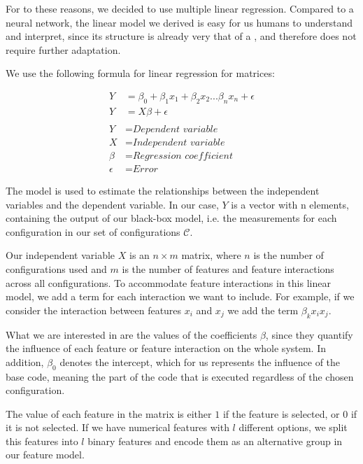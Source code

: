 For to these reasons, we decided to use multiple linear regression. Compared to a neural network, the linear model we 
derived is easy for us humans to understand and interpret, since its structure is already very that of a \perfInfluenceModel,
and therefore does not require further adaptation.

We use the following formula for linear regression for matrices\cite{Linear-Regression-Performance}:

\begin{align}\label{formula:linReg}
    Y &= \beta_0 + \beta_1 x_1 + \beta_2 x_2 ... \beta_n x_n + \epsilon   \\
    Y &= X \beta + \epsilon \nonumber\\ \nonumber \\ \nonumber
    Y &= \textit{Dependent variable}\\ \nonumber
    X &= \textit{Independent variable}\\ \nonumber
    \beta &= \textit{Regression coefficient}\\ \nonumber
    \epsilon &= \textit{Error} \nonumber
\end{align}

The model is used to estimate the relationships between the independent variables and the dependent variable.
In our case, $Y$ is a vector with n elements, containing the output of our black-box model, 
i.e. the measurements for each configuration in our set of configurations $\mathcal{C}$. 

Our independent variable $X$ is an $n \times m$ matrix, where $n$ is the number of configurations used and $m$ is the number of features and feature
interactions across all configurations.
To accommodate feature interactions in this linear model, we add a term for each interaction we want to include. For example,
if we consider the interaction between features $x_i$ and $x_j$ we add the term $\beta_k x_i x_j$. 

What we are interested in are the values of the coefficients $\beta$, since they quantify the influence of each feature or feature interaction
on the whole system. In addition, $\beta_0$ denotes the intercept, which for us represents the influence of the base code, meaning
the part of the code that is executed regardless of the chosen configuration.

The value of each feature in the matrix is either $1$ if the feature is selected, or $0$ if it is not selected. 
If we have numerical features with $l$ different options,
we split this features into $l$ binary features and encode them as an alternative group in our feature model.

